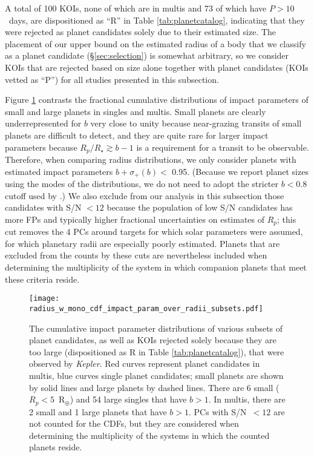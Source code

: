 \documentclass{aastex62}
\newcommand{\ikt}{{\it Kepler}}
\begin{document}
A total of 100 KOIs, none of which are in multis and 73 of which have $P > 10$~days, are dispositioned as ``R'' in Table \ref{tab:planetcatalog},
indicating that they were rejected as planet candidates solely due to their estimated size.  The placement of our upper bound on the estimated radius of a body that we classify as a planet candidate (\S\ref{sec:selection}) is somewhat arbitrary, so we consider KOIs that are rejected based on size alone together with planet candidates (KOIs vetted as ``P'') for all studies presented in this subsection.  

Figure \ref{fig:cdfimpactparambgt1} contrasts the fractional cumulative distributions of impact parameters of small and large planets in singles and multis. Small planets are clearly underrepresented for $b$ very close to unity because near-grazing transits of small planets are difficult to detect, and they are quite rare for larger impact parameters because $R_p/R_\star \gtrsim b-1$ is a requirement for a transit to be observable. Therefore, when comparing radius distributions, we only consider planets with estimated impact parameters $b + \sigma_+(b) <$ 0.95. (Because we report planet sizes using the modes of the distributions, we do not need to adopt the stricter $b < 0.8$ cutoff used by \citealt{Petigura:2020}.) We also exclude from our analysis in this subsection those candidates with S/N $< 12$ because the population of low S/N candidates has more FPs and typically higher fractional uncertainties on estimates of $R_p$; this cut removes the 4 PCs around targets for which solar parameters were assumed, for which planetary radii are especially poorly estimated. Planets that are excluded from the counts by these cuts are nevertheless included when determining the multiplicity of the system in which companion planets that meet these criteria reside.

\begin{figure}
    \centering
    \texttt{[image: radius\_w\_mono\_cdf\_impact\_param\_over\_radii\_subsets.pdf]}
    \caption{The cumulative impact parameter distributions of various subsets of planet candidates, as well as KOIs rejected solely because they are too large (dispositioned as R in Table \ref{tab:planetcatalog}), that were observed by \ikt. Red curves represent planet candidates in multis, blue curves single planet candidates; small planets are shown by solid lines and large planets by dashed  lines. There are 6 small ($R_p < 5$~R$_\oplus$) and 54 large singles that have $b > 1$. In multis, there are 2 small and 1 large planets  that have $b > 1$.  PCs with S/N~$< 12$ are not counted for the CDFs, but they are considered when determining the multiplicity of the systems in which the counted planets reside.}%
    \label{fig:cdfimpactparambgt1}
\end{figure}
\end{document}
